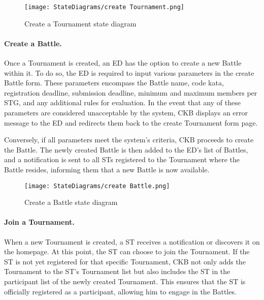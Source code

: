 \begin{figure}[H]
    \begin{center}
        \texttt{[image: StateDiagrams/create Tournament.png]}
        \caption{Create a Tournament state diagram}
        \label{fig:create_Tournament_sd}%
    \end{center}
\end{figure}

\paragraph{Create a Battle.}
Once a Tournament is created, an ED has the option to create a new Battle within it. To do so, the ED is required to input various parameters in the create Battle form. These parameters encompass the Battle name, code kata, registration deadline, submission deadline, minimum and maximum members per STG, and any additional rules for evaluation. In the event that any of these parameters are considered unacceptable by the system, CKB displays an error message to the ED and redirects them back to the create Tournament form page.

Conversely, if all parameters meet the system's criteria, CKB proceeds to create the Battle. The newly created Battle is then added to the ED's list of Battles, and a notification is sent to all STs registered to the Tournament where the Battle resides, informing them that a new Battle is now available.

\begin{figure}[H]
    \begin{center}
        \texttt{[image: StateDiagrams/create Battle.png]}
        \caption{Create a Battle state diagram}
        \label{fig:create_Battle_sd}%
    \end{center}
\end{figure}

\paragraph{Join a Tournament.}
When a new Tournament is created, a ST receives a notification or discovers it on the homepage. At this point, the ST can choose to join the Tournament. If the ST is not yet registered for that specific Tournament, CKB not only adds the Tournament to the ST's Tournament list but also includes the ST in the participant list of the newly created Tournament. This ensures that the ST is officially registered as a participant, allowing him to engage in the Battles.


